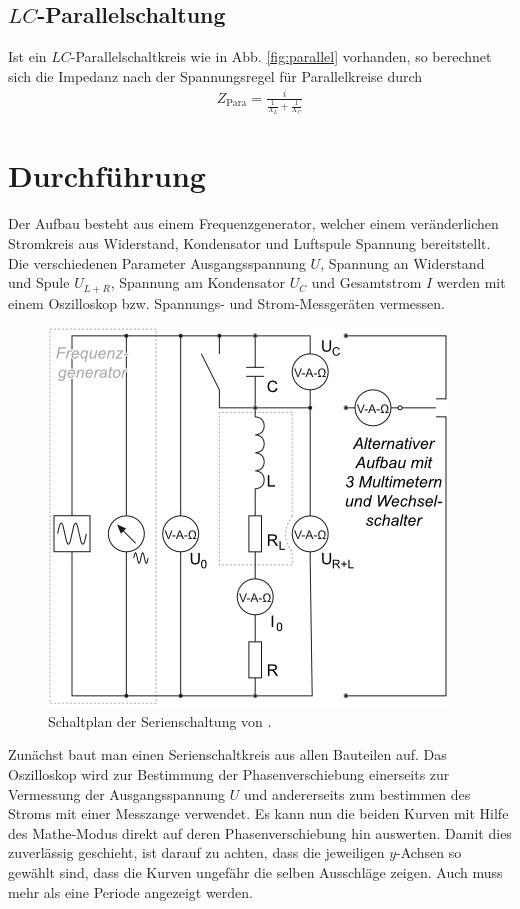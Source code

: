 \documentclass[12pt,a4paper,titlepage,headinclude,bibtotoc]{scrartcl}
\begin{document}
\subsection{$LC$-Parallelschaltung}
\label{sec:LC}
Ist ein $LC$-Parallelschaltkreis wie in Abb. \ref{fig:parallel} vorhanden, so berechnet sich die Impedanz nach der Spannungsregel für Parallelkreise durch
\begin{align*}
Z_\text{Para}=\frac{i}{\frac{1}{X_L}+\frac{1}{X_C}}
\end{align*}
\section{Durchführung}
\label{sec:durchfuehrung}
Der Aufbau besteht aus einem Frequenzgenerator, welcher einem veränderlichen Stromkreis aus Widerstand, Kondensator und Luftspule Spannung bereitstellt.
Die verschiedenen Parameter Ausgangsspannung $U$, Spannung an Widerstand und Spule $U_{L+R}$, Spannung am Kondensator $U_C$ und Gesamtstrom $I$ werden mit einem Oszilloskop bzw. Spannungs- und Strom-Messgeräten vermessen.\\

\begin{figure}[!h]
\centering
\includegraphics[width=0.6\linewidth]{serie}
\caption{Schaltplan der Serienschaltung von \cite[4.10.2014, 15:30]{LP14}.}
\label{fig:serienschaltung}
\end{figure}
Zunächst baut man einen Serienschaltkreis aus allen Bauteilen auf.
Das Oszilloskop wird zur Bestimmung der Phasenverschiebung einerseits zur Vermessung der Ausgangsspannung $U$ und andererseits zum bestimmen des Stroms mit einer Messzange verwendet.
Es kann nun die beiden Kurven mit Hilfe des Mathe-Modus direkt auf deren Phasenverschiebung hin auswerten.
Damit dies zuverlässig geschieht, ist darauf zu achten, dass die jeweiligen $y$-Achsen so gewählt sind, dass die Kurven ungefähr die selben Ausschläge zeigen.
Auch muss mehr als eine Periode angezeigt werden.
\end{document}
